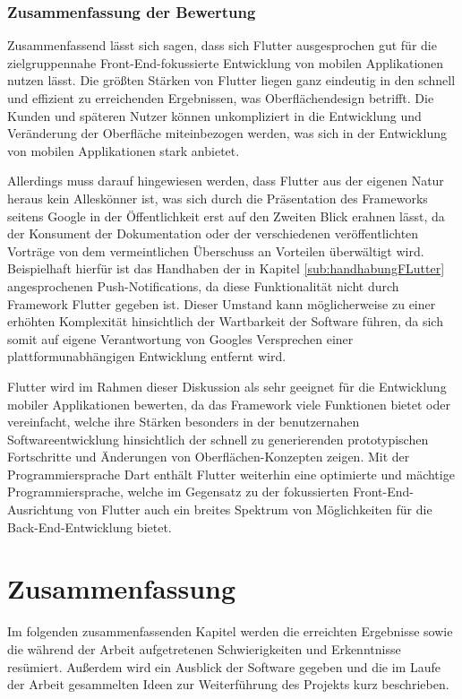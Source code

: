 \documentclass[bibliography=totoc,listof=totoc,BCOR=5mm,DIV=12,oneside]{scrbook}
\begin{document}
{\subsection{Zusammenfassung der Bewertung}
\par Zusammenfassend lässt sich sagen, dass sich Flutter ausgesprochen gut für die zielgruppennahe Front-End-fokussierte Entwicklung von mobilen Applikationen nutzen lässt. Die größten Stärken von Flutter liegen ganz eindeutig in den schnell und effizient zu erreichenden Ergebnissen, was Oberflächendesign betrifft. Die Kunden und späteren Nutzer können unkompliziert in die Entwicklung und Veränderung der Oberfläche miteinbezogen werden, was sich in der Entwicklung von mobilen Applikationen stark anbietet.

\par \bigskip Allerdings muss darauf hingewiesen werden, dass Flutter aus der eigenen Natur heraus kein Alleskönner ist, was sich durch die Präsentation des Frameworks seitens Google in der Öffentlichkeit erst auf den Zweiten Blick erahnen lässt, da der Konsument der Dokumentation oder der verschiedenen veröffentlichten Vorträge von dem vermeintlichen Überschuss an Vorteilen überwältigt wird. Beispielhaft hierfür ist das Handhaben der in Kapitel \ref{sub:handhabungFLutter} angesprochenen Push-Notifications, da diese Funktionalität nicht durch Framework Flutter gegeben ist. Dieser Umstand kann möglicherweise zu einer erhöhten Komplexität hinsichtlich der Wartbarkeit der Software führen, da sich somit auf eigene Verantwortung von Googles Versprechen einer plattformunabhängigen Entwicklung entfernt wird.

\par \bigskip Flutter wird im Rahmen dieser Diskussion als sehr geeignet für die Entwicklung mobiler Applikationen bewerten, da das Framework viele Funktionen bietet oder vereinfacht, welche ihre Stärken besonders in der benutzernahen Softwareentwicklung hinsichtlich der schnell zu generierenden prototypischen Fortschritte und Änderungen von Oberflächen-Konzepten zeigen. Mit der Programmiersprache Dart enthält Flutter weiterhin eine optimierte und mächtige Programmiersprache, welche im Gegensatz zu der fokussierten Front-End-Ausrichtung von Flutter auch ein breites Spektrum von Möglichkeiten für die Back-End-Entwicklung bietet.

\chapter{Zusammenfassung} \label{chap:ergebnisse}
\par Im folgenden zusammenfassenden Kapitel werden die erreichten Ergebnisse sowie die während der Arbeit aufgetretenen Schwierigkeiten und Erkenntnisse resümiert. Außerdem wird ein Ausblick der Software gegeben und die im Laufe der Arbeit gesammelten Ideen zur Weiterführung des Projekts kurz beschrieben.

}
\end{document}
